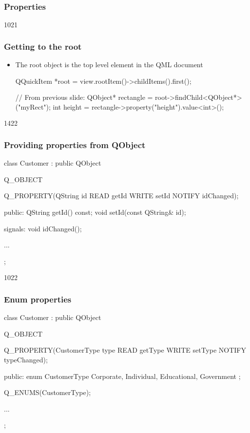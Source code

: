 \subsubsection{Properties}
\begin{slide}[fragile]{1021}
\frametitle{Getting to the root}
\begin{itemize}
\item The root object is the top level element in the QML document
\begin{cpp}
QQuickItem *root = view.rootItem()->childItems().first();

// From previous slide:
QObject* rectangle = root->findChild<QObject*>("myRect");
int height = rectangle->property("height").value<int>();
\end{cpp}
\end{itemize}
\end{slide}

\begin{slide}[fragile]{1422}
\frametitle{Providing properties from QObject}
\begin{cpp}
class Customer : public QObject
{
    Q_OBJECT

    Q_PROPERTY(QString id READ getId WRITE setId NOTIFY idChanged);

  public:
     QString getId() const;
     void setId(const QString& id);
  
  signals:
     void idChanged();

  ...
};
\end{cpp}
\end{slide}

\begin{slide}[fragile]{1022}
\frametitle{Enum properties}
\begin{cpp}
class Customer : public QObject
{
    Q_OBJECT

    Q_PROPERTY(CustomerType type READ getType WRITE setType 
               NOTIFY typeChanged);

  public:
    enum CustomerType {
      Corporate, Individual, Educational, Government
    };

    Q_ENUMS(CustomerType);
    
  ...
};
\end{cpp}
\end{slide}

